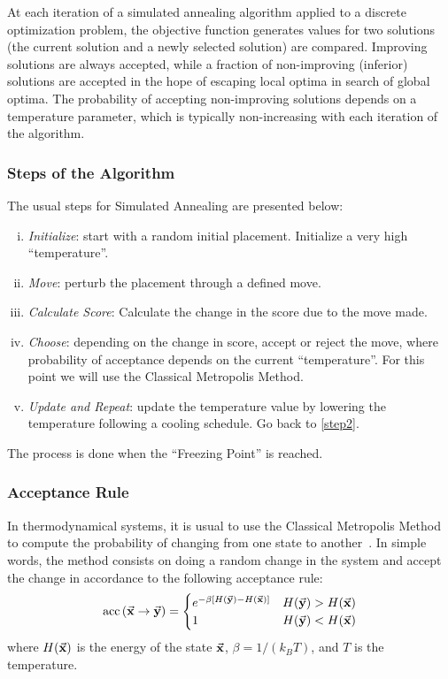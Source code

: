 At each iteration of a simulated annealing algorithm applied to a discrete optimization problem, the objective function generates values for two solutions (the current solution and a newly selected solution) are compared. Improving solutions are always accepted, while a fraction of non-improving (inferior) solutions are accepted in the hope of escaping local optima in search of global optima. The probability of accepting non-improving solutions depends on a temperature parameter, which is typically non-increasing with each iteration of the algorithm.

\subsubsection*{Steps of the Algorithm}
The usual steps for Simulated Annealing are presented below:
\begin{enumerate}[(i)]
    \item \emph{Initialize}: start with a random initial placement. Initialize a very high “temperature”.
    \item \emph{Move}: perturb the placement through a defined move.\label{step2}
    \item \emph{Calculate Score}: Calculate the change in the score due to the move made. 
    \item \emph{Choose}: depending on the change in score, accept or reject the move, where probability of acceptance depends on the current “temperature”. For this point we will use the Classical Metropolis Method.
    \item \emph{Update and Repeat}: update the temperature value by
    lowering the temperature following a cooling schedule. Go back to \ref{step2}.
\end{enumerate}

The process is done when the “Freezing Point” is reached.

\subsubsection*{Acceptance Rule}
In thermodynamical systems, it is usual to use the Classical Metropolis Method to compute the probability of changing from one state to another~\cite{Frenkel2002}. In simple words, the method consists on doing a random change in the system and accept the change in accordance to the following acceptance rule:
\begin{align}
	\operatorname{acc}\qty(\va{x} \to \va{y}) =
	\begin{cases}
		e^{- \beta \qty[H(\va{y}) - H(\va{x})]} & H(\va{y}) > H(\va{x}) \\
		1                                       & H(\va{y}) < H(\va{x})
	\end{cases}
\end{align}
where $H(\va{x})$ is the energy of the state $\va{x}$, $\beta = 1/(k_{B} T)$, and $T$ is the temperature.

